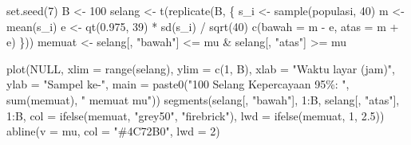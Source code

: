 \documentclass[
  indonesian,
  letterpaper,
]{book}
\newenvironment{Shaded}{\begin{snugshade}}{\end{snugshade}}
\newcommand{\AttributeTok}[1]{\textcolor[rgb]{0.40,0.45,0.13}{#1}}
\newcommand{\ConstantTok}[1]{\textcolor[rgb]{0.56,0.35,0.01}{#1}}
\newcommand{\DecValTok}[1]{\textcolor[rgb]{0.68,0.00,0.00}{#1}}
\newcommand{\FloatTok}[1]{\textcolor[rgb]{0.68,0.00,0.00}{#1}}
\newcommand{\FunctionTok}[1]{\textcolor[rgb]{0.28,0.35,0.67}{#1}}
\newcommand{\NormalTok}[1]{\textcolor[rgb]{0.00,0.23,0.31}{#1}}
\newcommand{\OtherTok}[1]{\textcolor[rgb]{0.00,0.23,0.31}{#1}}
\newcommand{\SpecialCharTok}[1]{\textcolor[rgb]{0.37,0.37,0.37}{#1}}
\newcommand{\StringTok}[1]{\textcolor[rgb]{0.13,0.47,0.30}{#1}}
\begin{document}
\begin{Shaded}
\begin{Highlighting}[]
\FunctionTok{set.seed}\NormalTok{(}\DecValTok{7}\NormalTok{)}
\NormalTok{B }\OtherTok{\textless{}{-}} \DecValTok{100}
\NormalTok{selang }\OtherTok{\textless{}{-}} \FunctionTok{t}\NormalTok{(}\FunctionTok{replicate}\NormalTok{(B, \{}
\NormalTok{  s\_i }\OtherTok{\textless{}{-}} \FunctionTok{sample}\NormalTok{(populasi, }\DecValTok{40}\NormalTok{)}
\NormalTok{  m   }\OtherTok{\textless{}{-}} \FunctionTok{mean}\NormalTok{(s\_i)}
\NormalTok{  e   }\OtherTok{\textless{}{-}} \FunctionTok{qt}\NormalTok{(}\FloatTok{0.975}\NormalTok{, }\DecValTok{39}\NormalTok{) }\SpecialCharTok{*} \FunctionTok{sd}\NormalTok{(s\_i) }\SpecialCharTok{/} \FunctionTok{sqrt}\NormalTok{(}\DecValTok{40}\NormalTok{)}
  \FunctionTok{c}\NormalTok{(}\AttributeTok{bawah =}\NormalTok{ m }\SpecialCharTok{{-}}\NormalTok{ e, }\AttributeTok{atas =}\NormalTok{ m }\SpecialCharTok{+}\NormalTok{ e)}
\NormalTok{\}))}
\NormalTok{memuat }\OtherTok{\textless{}{-}}\NormalTok{ selang[, }\StringTok{"bawah"}\NormalTok{] }\SpecialCharTok{\textless{}=}\NormalTok{ mu }\SpecialCharTok{\&}\NormalTok{ selang[, }\StringTok{"atas"}\NormalTok{] }\SpecialCharTok{\textgreater{}=}\NormalTok{ mu}

\FunctionTok{plot}\NormalTok{(}\ConstantTok{NULL}\NormalTok{, }\AttributeTok{xlim =} \FunctionTok{range}\NormalTok{(selang), }\AttributeTok{ylim =} \FunctionTok{c}\NormalTok{(}\DecValTok{1}\NormalTok{, B),}
     \AttributeTok{xlab =} \StringTok{"Waktu layar (jam)"}\NormalTok{, }\AttributeTok{ylab =} \StringTok{"Sampel ke{-}"}\NormalTok{,}
     \AttributeTok{main =} \FunctionTok{paste0}\NormalTok{(}\StringTok{"100 Selang Kepercayaan 95\%: "}\NormalTok{, }\FunctionTok{sum}\NormalTok{(memuat), }\StringTok{" memuat mu"}\NormalTok{))}
\FunctionTok{segments}\NormalTok{(selang[, }\StringTok{"bawah"}\NormalTok{], }\DecValTok{1}\SpecialCharTok{:}\NormalTok{B, selang[, }\StringTok{"atas"}\NormalTok{], }\DecValTok{1}\SpecialCharTok{:}\NormalTok{B,}
         \AttributeTok{col =} \FunctionTok{ifelse}\NormalTok{(memuat, }\StringTok{"grey50"}\NormalTok{, }\StringTok{"firebrick"}\NormalTok{),}
         \AttributeTok{lwd =} \FunctionTok{ifelse}\NormalTok{(memuat, }\DecValTok{1}\NormalTok{, }\FloatTok{2.5}\NormalTok{))}
\FunctionTok{abline}\NormalTok{(}\AttributeTok{v =}\NormalTok{ mu, }\AttributeTok{col =} \StringTok{"\#4C72B0"}\NormalTok{, }\AttributeTok{lwd =} \DecValTok{2}\NormalTok{)}
\end{Highlighting}
\end{Shaded}
\end{document}
